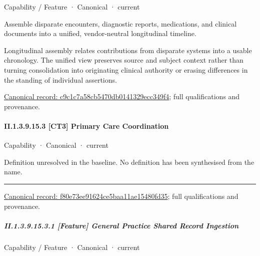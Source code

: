 \label{element:c9c1c7a58cb5470db0141329ecc349f4}
{\small Capability / Feature · Canonical · current}\par

Assemble disparate encounters, diagnostic reports, medications, and clinical documents into a unified, vendor-neutral longitudinal timeline.



Longitudinal assembly relates contributions from disparate systems into a usable chronology. The unified view preserves source and subject context rather than turning consolidation into originating clinical authority or erasing differences in the standing of individual assertions.


{\footnotesize \href{../../../../continuum/strategy/capability/feature/c9c1c7a58cb5470db0141329ecc349f4.md}{Canonical record: c9c1c7a58cb5470db0141329ecc349f4}; full qualifications and provenance.}\par
\paragraph*{II.1.3.9.15.3 [CT3] Primary Care Coordination}
\label{navigation:II.1.3.9.15.3}

\label{element:f80e73ee91624ce5baa11ae15480fd35}
{\small Capability · Canonical · current}\par

Definition unresolved in the baseline. No definition has been synthesised from the name.



\medskip\hrule\medskip

{\footnotesize \href{../../../../continuum/strategy/capability/f80e73ee91624ce5baa11ae15480fd35.md}{Canonical record: f80e73ee91624ce5baa11ae15480fd35}; full qualifications and provenance.}\par
\subparagraph*{II.1.3.9.15.3.1 [Feature] General Practice Shared Record Ingestion}
\label{navigation:II.1.3.9.15.3.1}

\label{element:869b77462ece488788c5a20598e7d587}
{\small Capability / Feature · Canonical · current}\par

